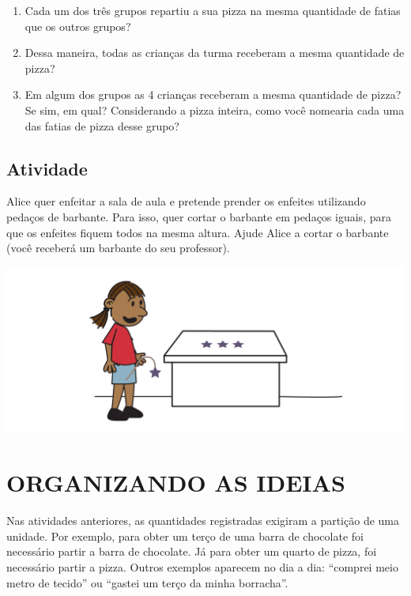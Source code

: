 \begin{enumerate} [\quad a)] %
  \item     Cada um dos três grupos repartiu a sua pizza na mesma quantidade de fatias que os outros grupos?
  \item     Dessa maneira, todas as crianças da turma receberam a mesma quantidade de pizza?
  \item     Em algum dos grupos as 4 crianças receberam a mesma quantidade de pizza? Se sim, em qual? Considerando a pizza inteira, como você nomearia cada uma das fatias de pizza desse grupo? 
\end{enumerate} %

\subsection{Atividade}

Alice quer enfeitar a sala de aula e pretende prender os enfeites utilizando pedaços de barbante. Para isso, quer cortar o barbante em pedaços iguais, para que os enfeites fiquem todos na mesma altura. Ajude Alice a cortar o barbante (você receberá um barbante do seu professor).

\begin{center}
    \includegraphics[width=400pt, keepaspectratio]{..//media/cap1/secoes/pngs_licao_01/ativ3_fig01.png}  
  \end{center}
 

\section{ORGANIZANDO AS IDEIAS }

Nas atividades anteriores, as quantidades registradas exigiram a partição de uma unidade. Por exemplo, para obter um terço de uma barra de chocolate foi necessário partir a barra de chocolate. Já para obter um quarto de pizza, foi necessário partir a pizza. Outros exemplos aparecem no dia a dia: ``comprei meio metro de tecido'' ou ``gastei um terço da minha borracha''.

